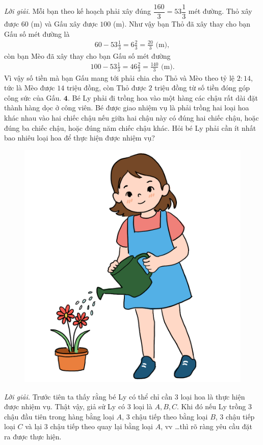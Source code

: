 \begin{multicols}{2}
\begin{figure}[H]
		\vspace*{-15pt}
	\end{figure}
	\textit{Lời giải.} 	Mỗi bạn theo kế hoạch phải xây đúng $\dfrac{160}{3} = 53\dfrac{1}{3}$  mét đường. Thỏ xây được $60$ (m) và Gấu xây được $100$ (m). Như vậy bạn Thỏ đã xây thay cho bạn Gấu số mét đường là
	\begin{align*}
		60 - 53 \frac{1}{3} = 6 \frac{2}{3}= \frac{20}{3} \text{ (m)},
	\end{align*}
	còn bạn Mèo đã xây thay cho bạn Gấu số mét đường
	\begin{align*}
		100- 53 \frac{1}{3} = 46 \frac{2}{3}=\frac{140}{3} \text{ (m).}
	\end{align*}
	Vì vậy số tiền mà bạn Gấu mang tới phải chia cho Thỏ và Mèo theo tỷ lệ $2: 14$, tức là Mèo được $14$ triệu đồng, còn Thỏ được $2$ triệu đồng từ số tiền đóng góp công sức của Gấu.
	\vskip 0.1cm
	$\pmb{4.}$ Bé Ly phải đi trồng hoa vào một hàng các chậu rất dài đặt thành hàng dọc ở công viên. Bé được giao nhiệm vụ là phải trồng hai loại hoa khác nhau vào hai chiếc chậu nếu giữa hai chậu này có đúng hai chiếc chậu, hoặc đúng ba chiếc chậu, hoặc đúng năm chiếc chậu khác. Hỏi bé Ly phải cần ít nhất bao nhiêu loại hoa để thực hiện được nhiệm vụ?
	\begin{figure}[H]
		\centering
		\vspace*{-5pt}
		\captionsetup{labelformat= empty, justification=centering}
		\includegraphics[width=0.45\linewidth]{Pi7_bai4}
		\vspace*{-10pt}
	\end{figure}
	\textit{Lời giải.} Trước tiên ta thấy rằng bé Ly có thể chỉ cần $3$ loại hoa là thực hiện được nhiệm vụ. Thật vậy, giả sử Ly có $3$ loại là $A, B, C$. Khi đó nếu Ly trồng $3$ chậu đầu tiên trong hàng bằng loại $A$, $3$ chậu tiếp theo bằng loại $B$, $3$ chậu tiếp loại $C$ và lại $3$ chậu tiếp theo quay lại bằng loại $A$, vv \ldots thì rõ ràng yêu cầu đặt ra được thực hiện. 

\end{multicols}
